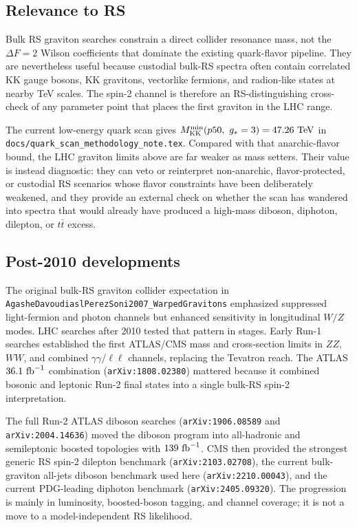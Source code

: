 \subsection*{Relevance to RS}
Bulk RS graviton searches constrain a direct collider resonance mass, not the
\(\Delta F=2\) Wilson coefficients that dominate the existing quark-flavor
pipeline.  They are nevertheless useful because custodial bulk-RS spectra often
contain correlated KK gauge bosons, KK gravitons, vectorlike fermions, and
radion-like states at nearby TeV scales.  The spin-2 channel is therefore an
RS-distinguishing cross-check of any parameter point that places the first
graviton in the LHC range.

The current low-energy quark scan gives
\(M_{\rm KK}^{\min}(p50,\ g_\ast=3)=47.26~{\rm TeV}\) in
\texttt{docs/quark\_scan\_methodology\_note.tex}.  Compared with that
anarchic-flavor bound, the LHC graviton limits above are far weaker as mass
setters.  Their value is instead diagnostic: they can veto or reinterpret
non-anarchic, flavor-protected, or custodial RS scenarios whose flavor
constraints have been deliberately weakened, and they provide an external check
on whether the scan has wandered into spectra that would already have produced
a high-mass diboson, diphoton, dilepton, or \(t\bar t\) excess.

\subsection*{Post-2010 developments}
The original bulk-RS graviton collider expectation in
\texttt{AgasheDavoudiaslPerezSoni2007\_WarpedGravitons} emphasized suppressed
light-fermion and photon channels but enhanced sensitivity in longitudinal
\(W/Z\) modes.  LHC searches after 2010 tested that pattern in stages.  Early
Run-1 searches established the first ATLAS/CMS mass and cross-section limits in
\(ZZ\), \(WW\), and combined \(\gamma\gamma/\ell\ell\) channels, replacing the
Tevatron reach.  The ATLAS \(36.1~{\rm fb}^{-1}\) combination
(\texttt{arXiv:1808.02380}) mattered because it combined bosonic and leptonic
Run-2 final states into a single bulk-RS spin-2 interpretation.

The full Run-2 ATLAS diboson searches (\texttt{arXiv:1906.08589} and
\texttt{arXiv:2004.14636}) moved the diboson program into all-hadronic and
semileptonic boosted topologies with \(139~{\rm fb}^{-1}\).  CMS then provided
the strongest generic RS spin-2 dilepton benchmark
(\texttt{arXiv:2103.02708}), the current bulk-graviton all-jets diboson
benchmark used here (\texttt{arXiv:2210.00043}), and the current PDG-leading
diphoton benchmark (\texttt{arXiv:2405.09320}).  The progression is mainly
in luminosity, boosted-boson tagging, and channel coverage; it is not a move to
a model-independent RS likelihood.

